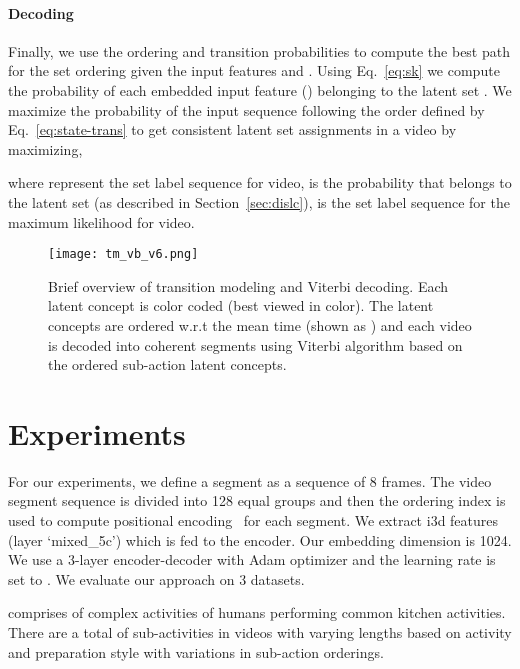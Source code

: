 \documentclass[final]{cvpr}
\begin{document}
\paragraph{Decoding}
\par Finally, we use the ordering and transition probabilities to compute the best path for the set ordering given the input features  and . 
Using Eq.~\ref{eq:sk} we compute the probability of each embedded input feature () belonging to the latent set . 
We maximize the probability of the input sequence following the order defined by Eq.~\ref{eq:state-trans} to get consistent latent set assignments in a video by maximizing,
\vspace{-0.3cm}

\noindent where  represent the set label sequence for  video,  is the probability that  belongs to the  latent set (as described in Section~\ref{sec:dislc}),  is the set label sequence for the maximum likelihood for  video.


\begin{figure}[t]
  \texttt{[image: tm\_vb\_v6.png]}
  
\caption{{\small Brief overview of transition modeling and Viterbi decoding. Each latent concept is color coded (best viewed in color). The latent concepts are ordered w.r.t the mean time (shown as ) and each video is decoded into coherent segments using Viterbi algorithm based on the ordered sub-action latent concepts.
}}
\vspace{-0.3cm}
\label{fig:tmvb}
\end{figure}

\section{Experiments}
\label{sec:exp}

For our experiments, we define a segment as a sequence of 8 frames. The video segment sequence is divided into 128 equal groups and then the ordering index is used to compute positional encoding~\cite{vaswani2017attention} for each segment. We extract {\sc i3d} features (layer `mixed\_5c') which is fed to the encoder. Our embedding dimension is 1024. We use a 3-layer encoder-decoder with Adam optimizer and the learning rate is set to . We evaluate our approach on 3 datasets.


 comprises of  complex activities of humans performing common kitchen activities. There are a total of  sub-activities in  videos with varying lengths based on activity and preparation style with variations in sub-action orderings.
\end{document}
